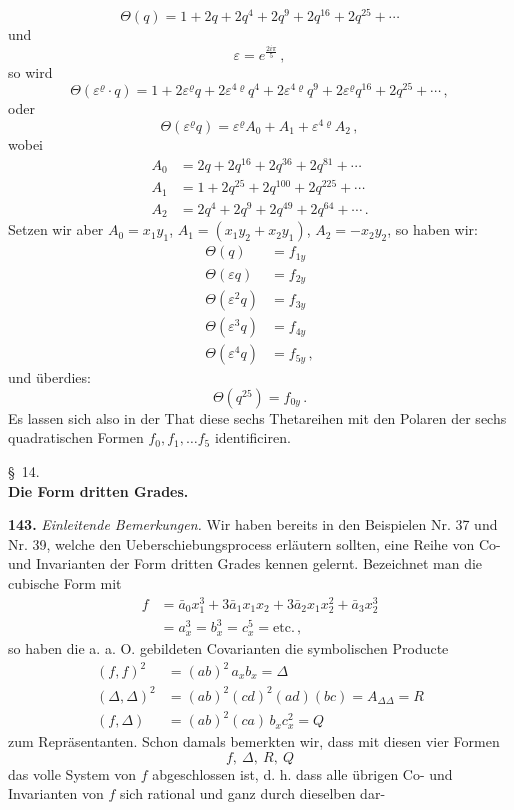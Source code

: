 \[
\Theta(q) = 1 + 2q + 2q^4 + 2q^9 + 2q^{16} + 2q^{25} + \cdots
\]
und
\[
\varepsilon = e^{\frac{2i\pi}{5}}\,,
\]
so wird
\[
\Theta(\varepsilon^\varrho\cdot q) = 1 + 2\varepsilon^\varrho q + 2\varepsilon^{4\varrho}q^4 + 2\varepsilon^{4\varrho}q^9 + 2\varepsilon^\varrho q^{16} + 2q^{25} + \cdots\,,
\]
oder
\[
\Theta(\varepsilon^\varrho q) = \varepsilon^\varrho A_0 + A_1 + \varepsilon^{4\varrho}A_2\,,
\]
wobei
\[
\begin{aligned}
A_0 &= 2q + 2q^{16} + 2q^{36} + 2q^{81} + \cdots \\
A_1 &= 1 + 2q^{25} + 2q^{100} + 2q^{225} + \cdots \\
A_2 &= 2q^4 + 2q^9 + 2q^{49} + 2q^{64} + \cdots\,.
\end{aligned}
\]
Setzen wir aber $A_0 = x_1y_1$, $A_1 = (x_1y_2 + x_2y_1)$, $A_2 = -x_2y_2$, so haben wir:
\[
\begin{aligned}
\Theta(q) &= f_{1y} \\
\Theta(\varepsilon q) &= f_{2y} \\
\Theta(\varepsilon^2 q) &= f_{3y} \\
\Theta(\varepsilon^3 q) &= f_{4y} \\
\Theta(\varepsilon^4 q) &= f_{5y}\,,
\end{aligned}
\]
und überdies:
\[
\Theta(q^{25}) = f_{0y}\,.
\]
Es lassen sich also in der That diese sechs Thetareihen mit den Polaren der sechs quadratischen Formen $f_0, f_1, \dots f_5$ identificiren.

\begin{center}
\S~14.\\[2pt]
\textbf{Die Form dritten Grades.}
\end{center}

\textbf{143.} \textit{Einleitende Bemerkungen.} Wir haben bereits in den Beispielen Nr. 37 und Nr. 39, welche den Ueberschiebungsprocess erläutern sollten, eine Reihe von Co- und Invarianten der Form dritten Grades kennen gelernt. Bezeichnet man die cubische Form mit
\[
\begin{aligned}
f &= \bar a_0 x_1^3 + 3\bar a_1 x_1x_2 + 3\bar a_2 x_1x_2^2 + \bar a_3 x_2^3 \\
&= a_x^3 = b_x^3 = c_x^5 = \text{etc.}\,,
\end{aligned}
\]
so haben die a. a. O. gebildeten Covarianten die symbolischen Producte
\[
\begin{aligned}
(f,f)^2 &= (ab)^2\,a_xb_x = \Delta \\
(\Delta,\Delta)^2 &= (ab)^2(cd)^2(ad)(bc) = A_{\Delta\Delta} = R \\
(f,\Delta) &= (ab)^2(ca)\,b_x c_x^2 = Q
\end{aligned}
\]
zum Repräsentanten. Schon damals bemerkten wir, dass mit diesen vier Formen
\[
f,\ \Delta,\ R,\ Q
\]
das volle System von $f$ abgeschlossen ist, d. h. dass alle übrigen Co- und Invarianten von $f$ sich rational und ganz durch dieselben dar-


